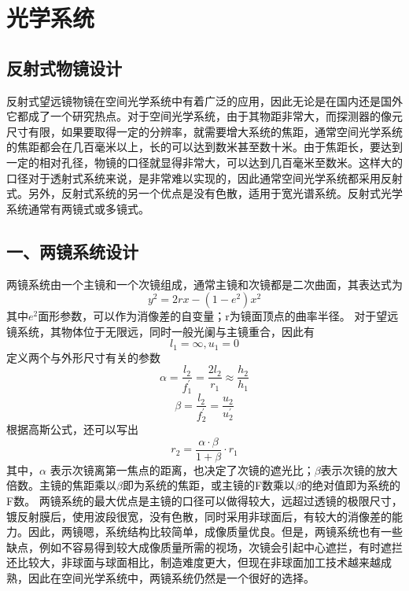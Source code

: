 \chapter{光学系统}\label{chap:Lens Design}
\section{反射式物镜设计}
反射式望远镜物镜在空间光学系统中有着广泛的应用，因此无论是在国内还是国外它都成了一个研究热点。对于空间光学系统，由于其物距非常大，而探测器的像元尺寸有限，如果要取得一定的分辨率，就需要增大系统的焦距，通常空间光学系统的焦距都会在几百毫米以上，长的可以达到数米甚至数十米。由于焦距长，要达到一定的相对孔径，物镜的口径就显得非常大，可以达到几百毫米至数米。这样大的口径对于透射式系统来说，是非常难以实现的，因此通常空间光学系统都采用反射式。另外，反射式系统的另一个优点是没有色散，适用于宽光谱系统。反射式光学系统通常有两镜式或多镜式。
\section{一、两镜系统设计}
两镜系统由一个主镜和一个次镜组成，通常主镜和次镜都是二次曲面，其表达式为
$$ y^2 = 2rx-(1-e^2 )x^2 $$
其中$ e^2  $面形参数，可以作为消像差的自变量；r为镜面顶点的曲率半径。
对于望远镜系统，其物体位于无限远，同时一般光阑与主镜重合，因此有
$$ l_1=\infty,u_1=0 $$
定义两个与外形尺寸有关的参数
$$ \alpha = \dfrac{l_2}{f_{1}^{'}} = \dfrac{2l_2}{r_1} \approx \dfrac{h_2}{h_1}$$
$$ \beta = \dfrac{l_2 ^{}}{f_{2}^{'}} =  \dfrac{u_2}{u_2^{'}}$$
根据高斯公式，还可以写出
$$ r_{2} =  \dfrac{\alpha \cdot\beta}{1+\beta}\cdot r_1$$
其中，$ \alpha $ 表示次镜离第一焦点的距离，也决定了次镜的遮光比；$ \beta $表示次镜的放大倍数。主镜的焦距乘以$ \beta $即为系统的焦距，或主镜的F数乘以$ \beta $的绝对值即为系统的F数。
两镜系统的最大优点是主镜的口径可以做得较大，远超过透镜的极限尺寸，镀反射膜后，使用波段很宽，没有色散，同时采用非球面后，有较大的消像差的能力。因此，两镜嗯，系统结构比较简单，成像质量优良。但是，两镜系统也有一些缺点，例如不容易得到较大成像质量所需的视场，次镜会引起中心遮拦，有时遮拦还比较大，非球面与球面相比，制造难度更大，但现在非球面加工技术越来越成熟，因此在空间光学系统中，两镜系统仍然是一个很好的选择。
